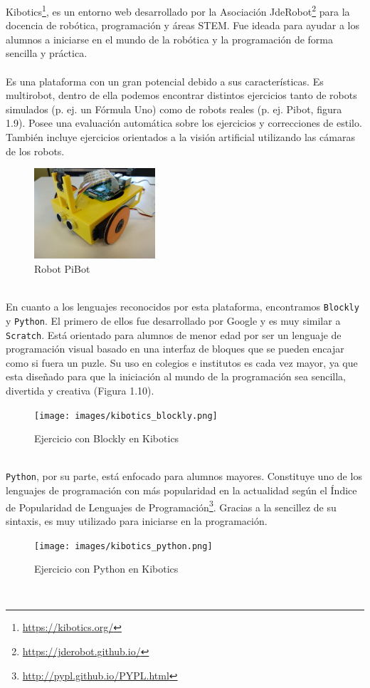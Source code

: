 \documentclass{report}
\begin{document}
Kibotics\footnote{\url{https://kibotics.org/}}, es un entorno web desarrollado por la Asociación JdeRobot\footnote{\url{https://jderobot.github.io/}} para la docencia de robótica, programación y áreas STEM. Fue ideada para ayudar a los alumnos a iniciarse en el mundo de la robótica y la programación de forma
sencilla y práctica.
\\
\\
Es una plataforma con un gran potencial debido a sus características. Es multirobot, dentro de ella podemos encontrar distintos ejercicios tanto de robots simulados (p. ej. un Fórmula Uno) como de robots reales (p. ej. Pibot, figura 1.9). Posee una evaluación automática sobre los ejercicios y correcciones de estilo. También incluye ejercicios orientados a la visión artificial utilizando las cámaras de los robots.
\\
\begin{figure}[h!]
  \centering
    \includegraphics[width=0.4\textwidth]{images/pibot.png}
  \caption{Robot PiBot}
  \label{Robot PiBot}
\end{figure}
\\
En cuanto a los lenguajes reconocidos por esta plataforma, encontramos \texttt{Blockly} y \texttt{Python}. El primero de ellos fue desarrollado por Google y es muy similar a \texttt{Scratch}. Está orientado para alumnos de menor edad por ser un lenguaje de programación visual basado en una interfaz de bloques que se pueden encajar como si fuera un puzle. Su uso en colegios e institutos es cada vez mayor, ya que esta diseñado para que la iniciación al mundo de la programación sea sencilla, divertida y creativa (Figura 1.10).
\\
\begin{figure}[h!]
  \centering
    \texttt{[image: images/kibotics\_blockly.png]}
  \caption{Ejercicio con Blockly en Kibotics}
  \label{Ejercicio con Blockly en Kibotics}
\end{figure}
\\
\texttt{Python}, por su parte, está enfocado para alumnos mayores. Constituye uno de los lenguajes de programación con más popularidad en la actualidad según el Índice de Popularidad de Lenguajes de Programación\footnote{\url{http://pypl.github.io/PYPL.html}}. Gracias a la sencillez de su sintaxis, es muy utilizado para iniciarse en la programación.
\\
\begin{figure}[h!]
  \centering
    \texttt{[image: images/kibotics\_python.png]}
  \caption{Ejercicio con Python en Kibotics}
  \label{Ejercicio con Python en Kibotics}
\end{figure}
\\
\end{document}

